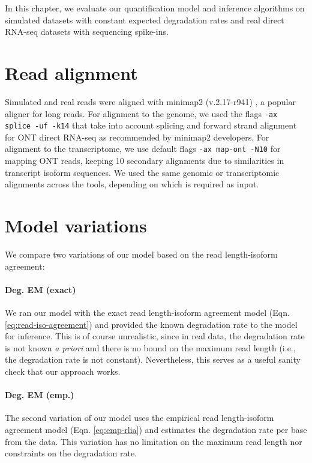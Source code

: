 
In this chapter, we evaluate our quantification model and inference algorithms on simulated datasets with constant expected degradation rates and real direct RNA-seq datasets with sequencing spike-ins. 

\section{Read alignment}

Simulated and real reads were aligned with minimap2 (v.2.17-r941) \cite{Minimap2018, Minimap2021}, a popular aligner for long reads. For alignment to the genome, we used the flags \texttt{-ax splice -uf -k14} that take into account splicing and forward strand alignment for ONT direct RNA-seq as recommended by minimap2 developers. For alignment to the transcriptome, we use default flags \texttt{-ax map-ont -N10} for mapping ONT reads, keeping 10 secondary alignments due to similarities in transcript isoform sequences. We used the same genomic or transcriptomic alignments across the tools, depending on which is required as input.   

\section{Model variations}

We compare two variations of our model based on the read length-isoform agreement:

\paragraph{Deg. EM (exact)} We ran our model with the exact read length-isoform agreement model (Eqn. \ref{eq:read-iso-agreement}) and provided the known degradation rate to the model for inference. This is of course unrealistic, since in real data, the degradation rate is not known \textit{a priori} and there is no bound on the maximum read length (i.e., the degradation rate is not constant). Nevertheless, this serves as a useful sanity check that our approach works. 

\paragraph{Deg. EM (emp.)} The second variation of our model uses the empirical read length-isoform agreement model (Eqn. \ref{eq:emp-rlia}) and estimates the degradation rate per base from the data. This variation has no limitation on the maximum read length nor constraints on the degradation rate. 

